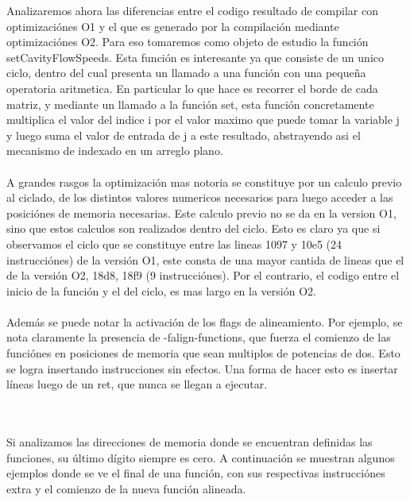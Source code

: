 Analizaremos ahora las diferencias entre el codigo resultado de compilar con optimizaciónes O1 y el que es generado por la compilación mediante optimizaciónes O2. Para eso tomaremos como objeto de estudio la función setCavityFlowSpeeds. Esta función es interesante ya que consiste de un unico ciclo, dentro del cual presenta un llamado a una función con una pequeña operatoria aritmetica. En particular lo que hace es recorrer el borde de cada matriz, y mediante un llamado a la función set, esta función concretamente multiplica el valor del indice i por el valor maximo que puede tomar la variable j y luego suma el valor de entrada de j a este resultado, abstrayendo asi el mecanismo de indexado en un arreglo plano.  
~\\
~\\
A grandes rasgos la optimización mas notoria se constituye por un calculo previo al ciclado, de los distintos valores numericos necesarios para luego acceder a las posiciónes de memoria necesarias. Este calculo previo no se da en la version O1, sino que estos calculos son realizados dentro del ciclo. Esto es claro ya que si observamos el ciclo que se constituye entre las lineas 1097 y 10e5 (24 instrucciónes) de la versión O1, este consta de una mayor cantida de lineas que el de la versión O2, 18d8, 18f9 (9 instrucciónes). Por el contrario, el codigo entre el inicio de la función y el del ciclo, es mas largo en la versión O2. 
~\\
~\\

Además se puede notar la activación de los flags de alineamiento. Por ejemplo, se nota claramente la presencia de -falign-functions, que fuerza el comienzo de las funciónes en posiciones de memoria que sean multiplos de potencias de dos. Esto se logra insertando instrucciones sin efectos. Una forma de hacer esto es insertar líneas luego de un ret, que nunca se llegan a ejecutar. 

~\\
~\\

Si analizamos las direcciones de memoria donde se encuentran definidas las funciones, su último dígito siempre es cero. A continuación se muestran algunos ejemplos donde se ve el final de una función, con sus respectivas instrucciónes extra y el comienzo de la nueva función alineada.

